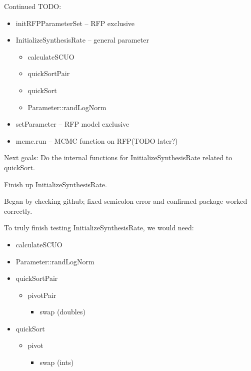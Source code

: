 \documentclass[12pt,hyperref]{labbook}
\begin{document}
Continued TODO:


\begin{itemize}
    \item initRFPParameterSet -- RFP exclusive
    \item InitializeSynthesisRate -- general parameter
    \begin{itemize}
        \item calculateSCUO
        \item quickSortPair
        \item quickSort
        \item Parameter::randLogNorm
    \end{itemize}
    \item setParameter -- RFP model exclusive
    \item mcmc.run -- MCMC function on RFP(TODO later?)
\end{itemize}

Next goals: Do the internal functions for InitializeSynthesisRate related to quickSort.

Finish up InitializeSynthesisRate.


Began by checking github; fixed semicolon error and confirmed package worked correctly.


To truly finish testing InitializeSynthesisRate, we would need:

\begin{itemize}
    \item calculateSCUO
    \item Parameter::randLogNorm
    \item quickSortPair
    \begin{itemize}
        \item pivotPair
        \begin{itemize}
            \item swap (doubles)
        \end{itemize}
    \end{itemize}
    \item quickSort
    \begin{itemize}
        \item pivot
        \begin{itemize}
            \item swap (ints)
        \end{itemize}
    \end{itemize}
\end{itemize}
\end{document}

